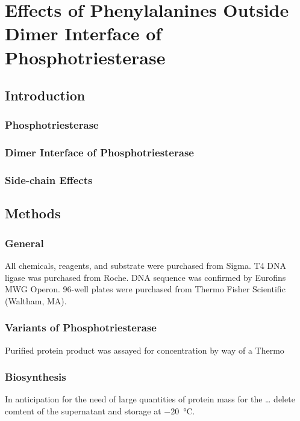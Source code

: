 \chapter{Effects of Phenylalanines Outside Dimer Interface of Phosphotriesterase}
\label{chap:dimer}
\begin{refsection}

\section{Introduction}

\subsection{Phosphotriesterase}

\subsection{Dimer Interface of Phosphotriesterase}

\subsection{Side-chain Effects}

\section{Methods}

\subsection{General}

All chemicals, reagents, and substrate were purchased from Sigma. T4 DNA ligase
was purchased from Roche. DNA sequence was confirmed by Eurofins MWG Operon.
96-well plates were purchased from Thermo Fisher Scientific (Waltham, MA)\cite{Yang2014a}.

\subsection{Variants of Phosphotriesterase}
Purified protein product was assayed for concentration by way of a Thermo

\subsection{Biosynthesis}

In anticipation for the need of large quantities of protein mass for the \ldots
delete comtent of the supernatant and storage at \SI{-20}{\celsius}.


\end{refsection}
